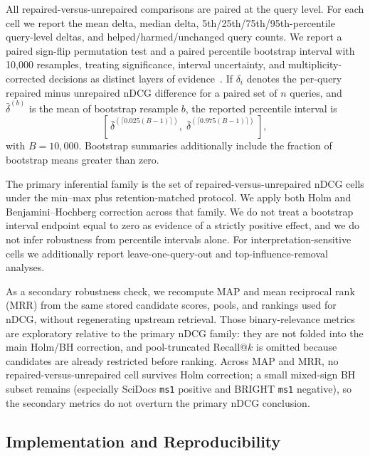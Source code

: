 \documentclass[manuscript,anonymous,review]{acmart}
\begin{document}
All repaired-versus-unrepaired comparisons are paired at the query level. For
each cell we report the mean delta, median delta, 5th/25th/75th/95th-percentile
query-level deltas, and helped/harmed/unchanged query counts. We report a
paired sign-flip permutation test and a paired percentile bootstrap interval
with 10{,}000 resamples, treating significance, interval uncertainty, and
multiplicity-corrected decisions as distinct layers of
evidence~\cite{urbano2019statistical}. If $\delta_i$ denotes the per-query repaired minus
unrepaired nDCG difference for a paired set of $n$ queries, and
$\bar{\delta}^{(b)}$ is the mean of bootstrap resample $b$, the reported
percentile interval is
\begin{equation}
  \left[\, \bar\delta^{(\lceil 0.025(B-1)\rceil)},\; \bar\delta^{(\lceil 0.975(B-1)\rceil)} \,\right],
  \label{eq:bootstrap-ci}
\end{equation}
with $B=10{,}000$. Bootstrap summaries additionally include the fraction of
bootstrap means greater than zero.

The primary inferential family is the set of repaired-versus-unrepaired nDCG
cells under the min--max plus retention-matched protocol. We apply both Holm
and Benjamini--Hochberg correction across that family. We do not treat a
bootstrap interval endpoint equal to zero as evidence of a strictly positive
effect, and we do not infer robustness from percentile intervals alone. For
interpretation-sensitive cells we additionally report leave-one-query-out and
top-influence-removal analyses.

As a secondary robustness check, we recompute MAP and mean reciprocal
rank (MRR) from the same stored candidate scores, pools, and rankings used for
nDCG, without regenerating upstream retrieval. Those binary-relevance metrics
are exploratory relative to the primary nDCG family: they are not folded into
the main Holm/BH correction, and pool-truncated Recall@$k$ is omitted because
candidates are already restricted before ranking. Across MAP and MRR, no
repaired-versus-unrepaired cell survives Holm correction; a small mixed-sign BH
subset remains (especially SciDocs \texttt{ms1} positive and BRIGHT
\texttt{ms1} negative), so the secondary metrics do not overturn the primary
nDCG conclusion.

\subsection{Implementation and Reproducibility}
\label{sec:implementation}
\end{document}
